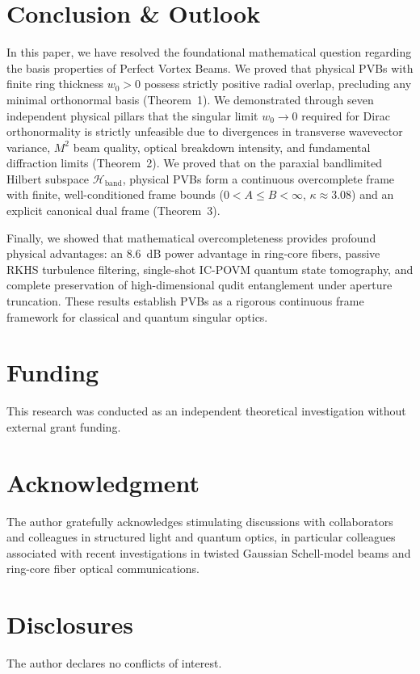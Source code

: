 \documentclass[11pt,a4paper]{article}
\begin{document}
\section{Conclusion \& Outlook}
\label{sec:conclusion}

In this paper, we have resolved the foundational mathematical question regarding the basis properties of Perfect Vortex Beams. We proved that physical PVBs with finite ring thickness $w_0 > 0$ possess strictly positive radial overlap, precluding any minimal orthonormal basis (Theorem~1). We demonstrated through seven independent physical pillars that the singular limit $w_0 \to 0$ required for Dirac orthonormality is strictly unfeasible due to divergences in transverse wavevector variance, $M^2$ beam quality, optical breakdown intensity, and fundamental diffraction limits (Theorem~2). We proved that on the paraxial bandlimited Hilbert subspace $\mathcal{H}_{\text{band}}$, physical PVBs form a continuous overcomplete frame with finite, well-conditioned frame bounds ($0 < A \le B < \infty$, $\kappa \approx 3.08$) and an explicit canonical dual frame (Theorem~3).

Finally, we showed that mathematical overcompleteness provides profound physical advantages: an 8.6~dB power advantage in ring-core fibers, passive RKHS turbulence filtering, single-shot IC-POVM quantum state tomography, and complete preservation of high-dimensional qudit entanglement under aperture truncation. These results establish PVBs as a rigorous continuous frame framework for classical and quantum singular optics.

\section*{Funding}
This research was conducted as an independent theoretical investigation without external grant funding.

\section*{Acknowledgment}
The author gratefully acknowledges stimulating discussions with collaborators and colleagues in structured light and quantum optics, in particular colleagues associated with recent investigations in twisted Gaussian Schell-model beams and ring-core fiber optical communications.

\section*{Disclosures}
The author declares no conflicts of interest.
\end{document}
